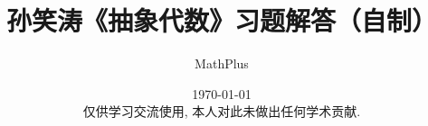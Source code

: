 \documentclass[hyper]{solutions-cn}
\title{孙笑涛《抽象代数》习题解答（自制）}
\author{MathPlus}
\date{
    \today
    \\[2em]
    仅供学习交流使用, 本人对此未做出任何学术贡献.
}
\begin{document}
\maketitle
\tableofcontents


\clearpage

\clearpage

\clearpage

\clearpage

\clearpage

\nocite{*}


\end{document}
